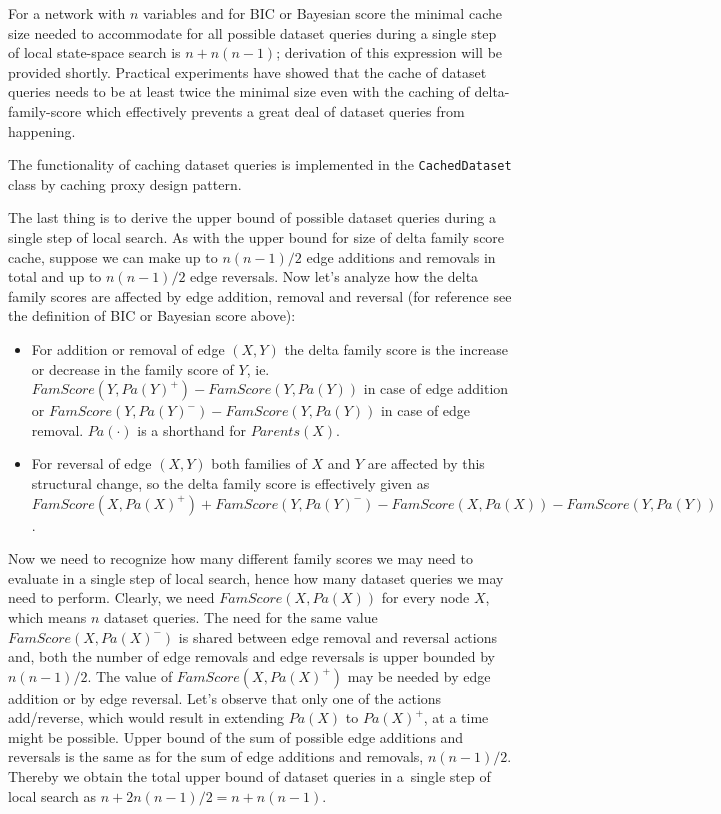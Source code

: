 \documentclass[english,cover]{fitthesis} %
\newcommand{\srccode}[1]{{\tt #1}}         %
\begin{document}
For a network with $n$ variables and for BIC or Bayesian score the minimal cache size needed to accommodate for all possible dataset queries during a single step of local state-space search is $n + n(n-1)$; derivation of this expression will be provided shortly. Practical experiments have showed that the cache of dataset queries needs to be at least twice the minimal size even with the caching of delta-family-score which effectively prevents a great deal of dataset queries from happening.

The functionality of caching dataset queries is implemented in the \srccode{CachedDataset} class by caching proxy design pattern.

\medskip
The last thing is to derive the upper bound of possible dataset queries during a single step of local search. As with the upper bound for size of delta family score cache, suppose we can make up to $n(n-1)/2$ edge additions and removals in total and up to $n(n-1)/2$ edge reversals. Now let's analyze how the delta family scores are affected by edge addition, removal and reversal (for reference see the definition of BIC or Bayesian score above):
\begin{itemize}
	\item For addition or removal of edge $(X,Y)$ the delta family score is the increase or decrease in the family score of $Y$, ie. $FamScore(Y,Pa(Y)^{+}) - FamScore(Y,Pa(Y))$ in case of edge addition or $FamScore(Y,Pa(Y)^{-}) - FamScore(Y,Pa(Y))$ in case of edge removal. $Pa(\cdot)$ is a shorthand for $Parents(X)$.
	\item For reversal of edge $(X,Y)$ both families of $X$ and $Y$ are affected by this structural change, so the delta family score is effectively given as $FamScore(X,Pa(X)^+) + FamScore(Y,Pa(Y)^-) - FamScore(X,Pa(X)) - FamScore(Y,Pa(Y))$.
\end{itemize}
Now we need to recognize how many different family scores we may need to evaluate in a single step of local search, hence how many dataset queries we may need to perform.
Clearly, we need $FamScore(X,Pa(X))$ for every node $X$, which means $n$ dataset queries.
The need for the same value $FamScore(X,Pa(X)^-)$ is shared between edge removal and reversal actions and, both the number of edge removals and edge reversals is upper bounded by $n(n-1)/2$.
The value of $FamScore(X,Pa(X)^+)$ may be needed by edge addition or by edge reversal. Let's observe that only one of the actions add/reverse, which would result in extending $Pa(X)$ to $Pa(X)^+$, at a time might be possible. Upper bound of the sum of possible edge additions and reversals is the same as for the sum of edge additions and removals, $n(n-1)/2$. Thereby we obtain the total upper bound of dataset queries in a~single step of local search as $n + 2n(n-1)/2 = n + n(n-1)$.
\end{document}
